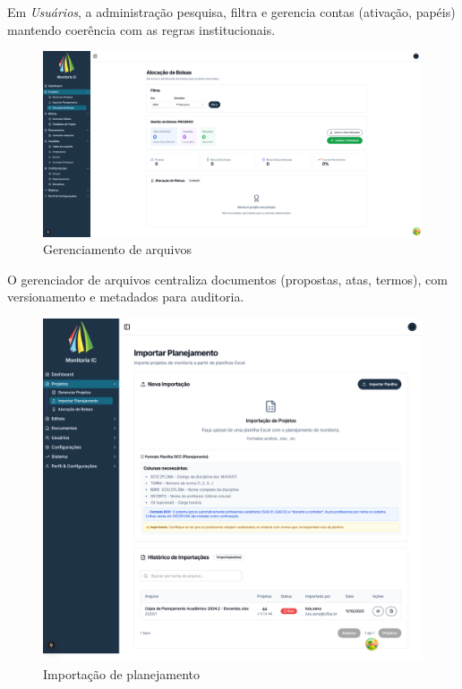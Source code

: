 \documentclass[portuguese]{sbc2025}%
\begin{document}
Em \textit{Usuários}, a administração pesquisa, filtra e gerencia contas (ativação, papéis) mantendo coerência com as regras institucionais.

\begin{figure}[h!]
  \centering
  \includegraphics[width=\linewidth]{images/monitoria/admin-files.png}
  \caption{Gerenciamento de arquivos}
  \label{fig:admin-files}
\end{figure}

O gerenciador de arquivos centraliza documentos (propostas, atas, termos), com versionamento e metadados para auditoria.

\begin{figure}[h!]
  \centering
  \includegraphics[width=\linewidth]{images/monitoria/admin-import-projects.png}
  \caption{Importação de planejamento}
  \label{fig:admin-import}
\end{figure}
\end{document}

